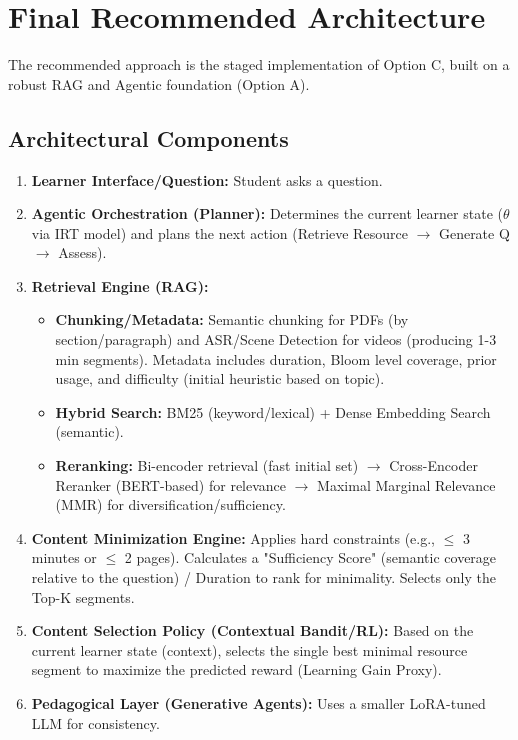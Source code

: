 \documentclass[12pt]{article}
\begin{document}
\section{Final Recommended Architecture}

The recommended approach is the staged implementation of Option C, built on a robust RAG and Agentic foundation (Option A).

\subsection{Architectural Components}
\begin{enumerate}
    \item \textbf{Learner Interface/Question:} Student asks a question.
    \item \textbf{Agentic Orchestration (Planner):} Determines the current learner state ($\theta$ via IRT model) and plans the next action (Retrieve Resource $\rightarrow$ Generate Q $\rightarrow$ Assess).
    \item \textbf{Retrieval Engine (RAG):}
    \begin{itemize}
        \item \textbf{Chunking/Metadata:} Semantic chunking for PDFs (by section/paragraph) and ASR/Scene Detection for videos (producing 1-3 min segments). Metadata includes duration, Bloom level coverage, prior usage, and difficulty (initial heuristic based on topic).
        \item \textbf{Hybrid Search:} BM25 (keyword/lexical) + Dense Embedding Search (semantic).
        \item \textbf{Reranking:} Bi-encoder retrieval (fast initial set) $\rightarrow$ Cross-Encoder Reranker (BERT-based) for relevance $\rightarrow$ Maximal Marginal Relevance (MMR) for diversification/sufficiency.
    \end{itemize}
    \item \textbf{Content Minimization Engine:} Applies hard constraints (e.g., $\le$ 3 minutes or $\le$ 2 pages). Calculates a "Sufficiency Score" (semantic coverage relative to the question) / Duration to rank for minimality. Selects only the Top-K segments.
    \item \textbf{Content Selection Policy (Contextual Bandit/RL):} Based on the current learner state (context), selects the single best minimal resource segment to maximize the predicted reward (Learning Gain Proxy).
    \item \textbf{Pedagogical Layer (Generative Agents):} Uses a smaller LoRA-tuned LLM for consistency.

\end{enumerate}
\end{document}
